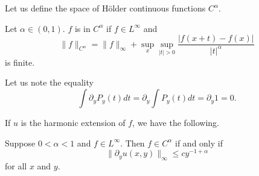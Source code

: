 
Let us define the space of H\"older continuous functions $C^\alpha$.

\begin{definition}\label{def:ch4_3.13}
Let $\alpha \in (0,1)$. $f$ is in $C^\alpha$ if $f \in L^\infty$ and
\[
    \|f\|_{C^\alpha} = \|f\|_\infty + \sup_x \sup_{|t|>0} \frac{|f(x+t)-f(x)|}{|t|^\alpha}
\]
is finite.
\end{definition}

Let us note the equality
\begin{equation}\label{eq:ch4_3.30}
    \int \partial_y P_y(t)dt = \partial_y \int P_y(t)dt = \partial_y 1 = 0.
\end{equation}

If $u$ is the harmonic extension of $f$, we have the following.

\begin{proposition}\label{prop:ch4_3.14}
Suppose $0 < \alpha < 1$ and $f \in L^\infty$. Then $f \in C^\alpha$ if and only if
\[\|\partial_y u(x,y)\|_\infty \leq cy^{-1+\alpha}\]
for all $x$ and $y$.
\end{proposition}

